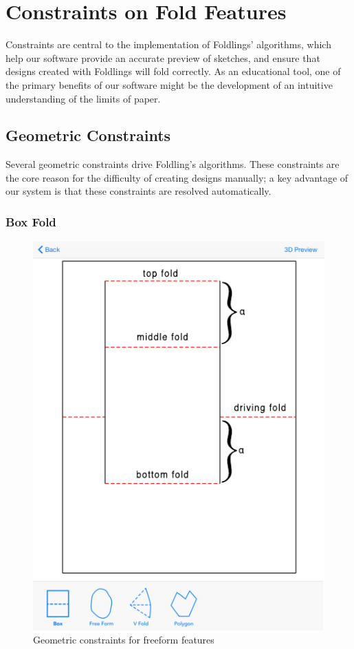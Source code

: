 \section{Constraints on Fold
Features}\label{constraints-on-fold-features}

Constraints are central to the implementation of Foldlings' algorithms,
which help our software provide an accurate preview of sketches, and
ensure that designs created with Foldlings will fold correctly. As an
educational tool, one of the primary benefits of our software might be
the development of an intuitive understanding of the limits of paper.

\subsection{Geometric Constraints}\label{geometric-constraints}

Several geometric constraints drive Foldling's algorithms. These
constraints are the core reason for the difficulty of creating designs
manually; a key advantage of our system is that these constraints are
resolved automatically.

\subsubsection{Box Fold}\label{box-fold}

\begin{figure}[htbp]
\centering
\includegraphics{figures/45_Tech_Constraints/boxfoldConstraints.pdf}
\caption{Geometric constraints for freeform features}
\end{figure}

